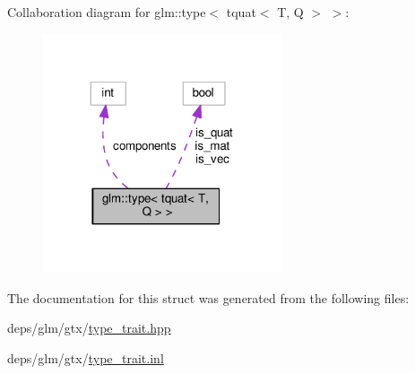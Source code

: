 Collaboration diagram for glm\+:\+:type$<$ tquat$<$ T, Q $>$ $>$\+:
\nopagebreak
\begin{figure}[H]
\begin{center}
\leavevmode
\includegraphics[width=200pt]{df/d50/structglm_1_1type_3_01tquat_3_01T_00_01Q_01_4_01_4__coll__graph}
\end{center}
\end{figure}


The documentation for this struct was generated from the following files\+:\begin{DoxyCompactItemize}
\item 
deps/glm/gtx/\hyperlink{type__trait_8hpp}{type\+\_\+trait.\+hpp}\item 
deps/glm/gtx/\hyperlink{type__trait_8inl}{type\+\_\+trait.\+inl}\end{DoxyCompactItemize}
